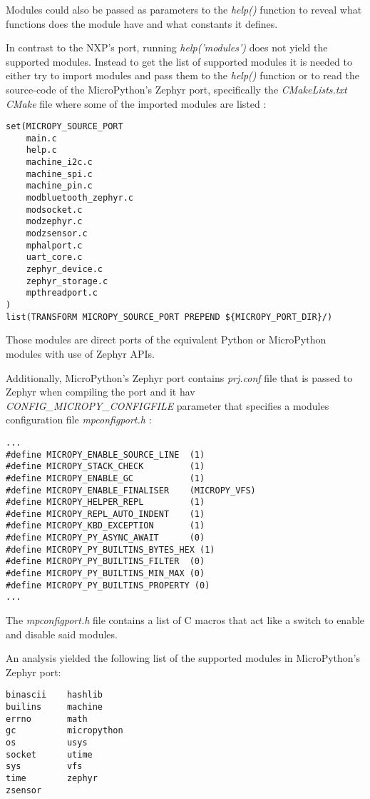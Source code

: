 \documentclass[twoside, 12pt]{article}
\begin{document}
Modules could also be passed as parameters to the \textit{help()} function to reveal what 
functions does the module have and what constants it defines.

\label{zephyr_mpy_moduels}
In contrast to the NXP's port, running \textit{help('modules')} does not yield the supported 
modules. Instead to get the list of supported modules it is needed to either try to import 
modules and pass them to the \textit{help()} function or to read the source-code of the 
MicroPython's Zephyr port, specifically the \textit{CMakeLists.txt CMake} file where some of 
the imported modules are listed :
\begin{lstlisting}[caption=Zephyr port CMake list, breaklines=true]
set(MICROPY_SOURCE_PORT
    main.c
    help.c
    machine_i2c.c
    machine_spi.c
    machine_pin.c
    modbluetooth_zephyr.c
    modsocket.c
    modzephyr.c
    modzsensor.c
    mphalport.c
    uart_core.c
    zephyr_device.c
    zephyr_storage.c
    mpthreadport.c
)
list(TRANSFORM MICROPY_SOURCE_PORT PREPEND ${MICROPY_PORT_DIR}/)
\end{lstlisting}

Those modules are direct ports of the equivalent Python or MicroPython modules with use of 
Zephyr APIs.

Additionally, MicroPython's Zephyr port contains \textit{prj.conf} file that is passed to 
Zephyr when compiling the port and it hav \textit{CONFIG\_MICROPY\_CONFIGFILE} parameter that
specifies a modules configuration file \textit{mpconfigport.h} :
\begin{lstlisting}[caption=Part of MicroPython's Zephyr port mpconfigport.h module conifguration file, breaklines=true]
...
#define MICROPY_ENABLE_SOURCE_LINE  (1)
#define MICROPY_STACK_CHECK         (1)
#define MICROPY_ENABLE_GC           (1)
#define MICROPY_ENABLE_FINALISER    (MICROPY_VFS)
#define MICROPY_HELPER_REPL         (1)
#define MICROPY_REPL_AUTO_INDENT    (1)
#define MICROPY_KBD_EXCEPTION       (1)
#define MICROPY_PY_ASYNC_AWAIT      (0)
#define MICROPY_PY_BUILTINS_BYTES_HEX (1)
#define MICROPY_PY_BUILTINS_FILTER  (0)
#define MICROPY_PY_BUILTINS_MIN_MAX (0)
#define MICROPY_PY_BUILTINS_PROPERTY (0)
...
\end{lstlisting}

The \textit{mpconfigport.h} file contains a list of C macros\cite{kernighan_c} that act like 
a switch to enable and disable said modules.

An analysis yielded the following list of the supported modules in MicroPython's Zephyr port:
\begin{lstlisting}[caption=Zephyr port modules, breaklines=true]
binascii    hashlib         
builins     machine    
errno       math       
gc          micropython
os          usys
socket      utime
sys         vfs
time        zephyr
zsensor
\end{lstlisting}
\end{document}
